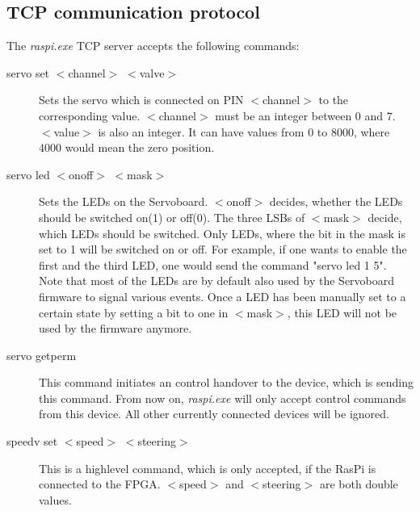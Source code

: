 \documentclass[a4paper
               ,10pt
               ,DIV=10 %
               ,BCOR=0.3cm
               ,pagesize %
               ,headings=small
               ,bibtotoc
               ]
               {scrartcl}
\begin{document}
\subsection{TCP communication protocol}
The \textit{raspi.exe} TCP server accepts the following commands:
\begin{description}
\item[servo set $<$channel$>$ $<$valve$>$] Sets the servo which is connected on PIN $<$channel$>$ to the corresponding value. $<$channel$>$ must be an integer between 0 and 7. $<$value$>$ is also an integer. It can have values from 0 to 8000, where 4000 would mean the zero position.
\item[servo led $<$onoff$>$ $<$mask$>$] Sets the LEDs on the Servoboard. $<$onoff$>$ decides, whether the LEDs should be switched on(1) or off(0). The three LSBs of $<$mask$>$ decide, which LEDs should be switched. Only LEDs, where the bit in the mask is set to 1 will be switched on or off. For example, if one wants to enable the first and the third LED, one would send the command "servo led 1 5". Note that most of the LEDs are by default also used by the Servoboard firmware to signal various events. Once a LED has been manually set to a certain state by setting a bit to one in $<$mask$>$, this LED will not be used by the firmware anymore.
\item[servo getperm] This command initiates an control handover to the device, which is sending this command. From now on, \textit{raspi.exe} will only accept control commands from this device. All other currently connected devices will be ignored.
\item[speedv set $<$speed$>$ $<$steering$>$] This is a highlevel command, which is only accepted, if the RasPi is connected to the FPGA. $<$speed$>$ and $<$steering$>$ are both double values.
\end{description}
\end{document}
